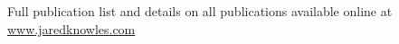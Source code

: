 \documentclass[margin,line]{res}
\begin{document}
\begin{resume}
Full publication list and details on all publications available online at 
\url{www.jaredknowles.com}


\vspace*{5mm}

% 
% 
% 
% 
% 
% 
% 
% 
% 
% 

\end{resume}
\end{document}
